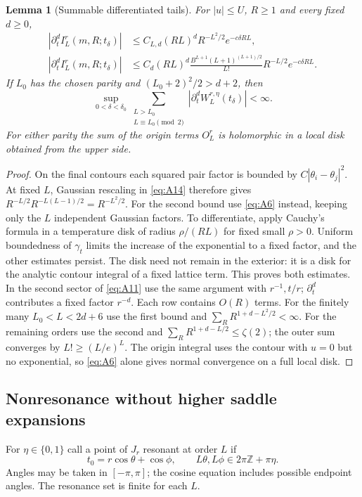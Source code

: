 \documentclass[11pt,a4paper]{article}
\numberwithin{equation}{section}
\theoremstyle{plain}
\newtheorem{lemma}[theorem]{Lemma}
\theoremstyle{definition}
\begin{document}
\begin{lemma}[Summable differentiated tails]\label{lem:tail}
For $|u|\le U$, $R\ge1$ and every fixed $d\ge0$,
\begin{align}
|\partial_t^d I_L^r(m,R;t_\delta)|&\le C_{L,d}(RL)^dR^{-L^2/2}e^{-c\delta RL},\label{eq:fixedtail}\\
|\partial_t^d I_L^r(m,R;t_\delta)|&\le C_d(RL)^d\frac{B^{L+1}(L+1)^{(L+1)/2}}{L!}R^{-L/2}e^{-c\delta RL}.\label{eq:A15}
\end{align}
If $L_0$ has the chosen parity and $(L_0+2)^2/2>d+2$, then
\begin{equation}
\sup_{0<\delta<\delta_0}\sum_{\substack{L>L_0\\L\equiv L_0\pmod2}}|\partial_t^d W_L^{r,\eta}(t_\delta)|<\infty.\label{eq:A16}
\end{equation}
For either parity the sum of the origin terms $O_L^r$ is holomorphic in a local disk obtained from the upper side.
\end{lemma}
\begin{proof}
On the final contours each squared pair factor is bounded by $C|\theta_i-\theta_j|^2$. At fixed $L$, Gaussian rescaling in \eqref{eq:A14} therefore gives $R^{-L/2}R^{-L(L-1)/2}=R^{-L^2/2}$. For the second bound use \eqref{eq:A6} instead, keeping only the $L$ independent Gaussian factors. To differentiate, apply Cauchy's formula in a temperature disk of radius $\rho/(RL)$ for fixed small $\rho>0$. Uniform boundedness of $\gamma_t$ limits the increase of the exponential to a fixed factor, and the other estimates persist. The disk need not remain in the exterior: it is a disk for the analytic contour integral of a fixed lattice term. This proves both estimates. In the second sector of \eqref{eq:A11} use the same argument with $r^{-1},t/r$; $\partial_t^d$ contributes a fixed factor $r^{-d}$. Each row contains $O(R)$ terms. For the finitely many $L_0<L<2d+6$ use the first bound and $\sum_R R^{1+d-L^2/2}<\infty$. For the remaining orders use the second and $\sum_R R^{1+d-L/2}\le\zeta(2)$; the outer sum converges by $L!\ge (L/e)^L$. The origin integral uses the contour with $u=0$ but no exponential, so \eqref{eq:A6} alone gives normal convergence on a full local disk.
\end{proof}

\subsection{Nonresonance without higher saddle expansions}\label{sec:poisson}
For $\eta\in\{0,1\}$ call a point of $J_r$ resonant at order $L$ if
\begin{equation}
t_0=r\cos\theta+\cos\phi,\qquad L\theta,L\phi\in 2\pi\mathbb Z+\pi\eta.\label{eq:A18}
\end{equation}
Angles may be taken in $[-\pi,\pi]$; the cosine equation includes possible endpoint angles. The resonance set is finite for each $L$.
\end{document}

